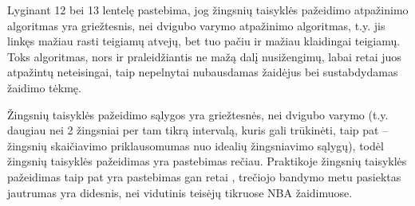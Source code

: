 \documentclass{VUMIFPSbakalaurinis}
\begin{document}
Lyginant 12 bei 13 lentelę pastebima, jog žingsnių taisyklės pažeidimo atpažinimo algoritmas yra griežtesnis, nei dvigubo varymo atpažinimo algoritmas, t.y. jis linkęs mažiau rasti teigiamų atvejų, bet tuo pačiu ir mažiau klaidingai teigiamų. Toks algoritmas, nors ir praleidžiantis ne mažą dalį nusižengimų, labai retai juos atpažintų neteisingai, taip nepelnytai nubausdamas žaidėjus bei sustabdydamas žaidimo tėkmę. 

Žingsnių taisyklės pažeidimo sąlygos yra griežtesnės, nei dvigubo varymo (t.y. daugiau nei 2 žingsniai per tam tikrą intervalą, kuris gali trūkinėti, taip pat – žingsnių skaičiavimo priklausomumas nuo idealių žingsniavimo sąlygų), todėl žingsnių taisyklės pažeidimas yra pastebimas rečiau. Praktikoje žingsnių taisyklės pažeidimas taip pat yra pastebimas gan retai \cite{SiglerK}, trečiojo bandymo metu pasiektas jautrumas yra didesnis, nei vidutinis teisėjų tikruose NBA žaidimuose. 
\end{document}
